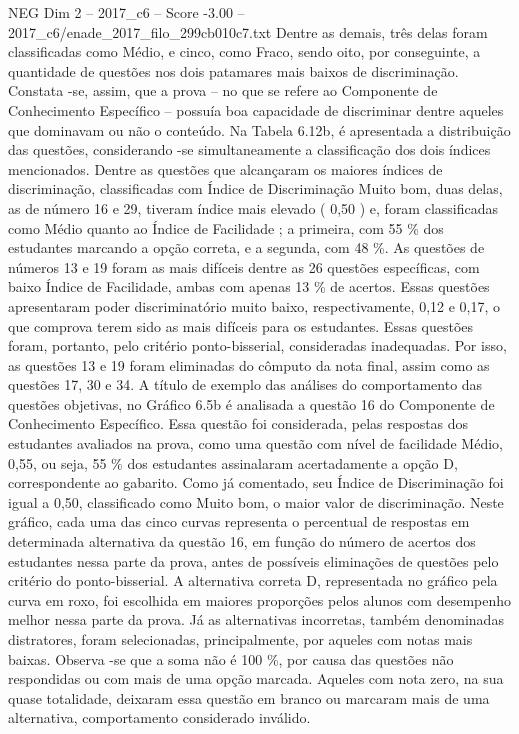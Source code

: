 \begin{textsample}{NEG Dim 2 – 2017\_c6 – Score -3.00 – 2017\_c6/enade\_2017\_filo\_299cb010c7.txt}
Dentre as demais, três delas foram classificadas como Médio, e cinco, como Fraco, sendo oito, por conseguinte, a quantidade de questões nos dois patamares mais baixos de discriminação.
Constata -se, assim, que a prova – no que se refere ao Componente de Conhecimento Específico – possuía boa capacidade de discriminar dentre aqueles que dominavam ou não o conteúdo.
Na Tabela 6.12b, é apresentada a distribuição das questões, considerando -se simultaneamente a classificação dos dois índices mencionados.
Dentre as questões que alcançaram os maiores índices de discriminação, classificadas com Índice de Discriminação Muito bom, duas delas, as de número 16 e 29, tiveram índice mais elevado ( 0,50 ) e, foram classificadas como Médio quanto ao Índice de Facilidade ; a primeira, com 55 \% dos estudantes marcando a opção correta, e a segunda, com 48 \%.
As questões de números 13 e 19 foram as mais difíceis dentre as 26 questões específicas, com baixo Índice de Facilidade, ambas com apenas 13 \% de acertos.
Essas questões apresentaram poder discriminatório muito baixo, respectivamente, 0,12 e 0,17, o que comprova terem sido as mais difíceis para os estudantes.
Essas questões foram, portanto, pelo critério ponto-bisserial, consideradas inadequadas.
Por isso, as questões 13 e 19 foram eliminadas do cômputo da nota final, assim como as questões 17, 30 e 34.
A título de exemplo das análises do comportamento das questões objetivas, no Gráfico 6.5b é analisada a questão 16 do Componente de Conhecimento Específico.
Essa questão foi considerada, pelas respostas dos estudantes avaliados na prova, como uma questão com nível de facilidade Médio, 0,55, ou seja, 55 \% dos estudantes assinalaram acertadamente a opção D, correspondente ao gabarito.
Como já comentado, seu Índice de Discriminação foi igual a 0,50, classificado como Muito bom, o maior valor de discriminação.
Neste gráfico, cada uma das cinco curvas representa o percentual de respostas em determinada alternativa da questão 16, em função do número de acertos dos estudantes nessa parte da prova, antes de possíveis eliminações de questões pelo critério do ponto-bisserial.
A alternativa correta D, representada no gráfico pela curva em roxo, foi escolhida em maiores proporções pelos alunos com desempenho melhor nessa parte da prova.
Já as alternativas incorretas, também denominadas distratores, foram selecionadas, principalmente, por aqueles com notas mais baixas.
Observa -se que a soma não é 100 \%, por causa das questões não respondidas ou com mais de uma opção marcada.
Aqueles com nota zero, na sua quase totalidade, deixaram essa questão em branco ou marcaram mais de uma alternativa, comportamento considerado inválido.

\end{textsample}
